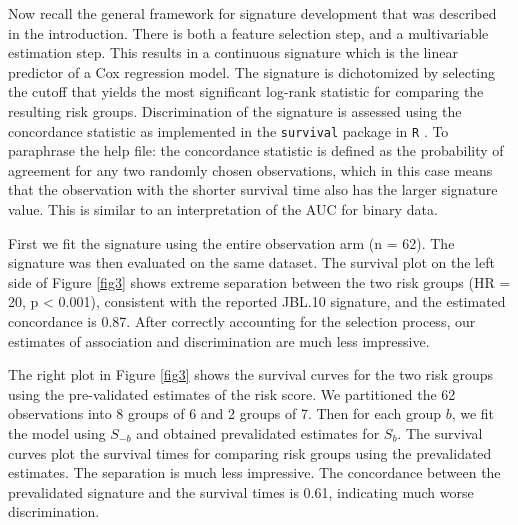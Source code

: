 \documentclass[11pt,]{article}
\begin{document}
Now recall the general framework for signature development that was
described in the introduction. There is both a feature selection step,
and a multivariable estimation step. This results in a continuous
signature which is the linear predictor of a Cox regression model. The
signature is dichotomized by selecting the cutoff that yields the most
significant log-rank statistic for comparing the resulting risk groups.
Discrimination of the signature is assessed using the concordance
statistic as implemented in the \texttt{survival} package in \texttt{R}
\citep{survival}. To paraphrase the help file: the concordance statistic
is defined as the probability of agreement for any two randomly chosen
observations, which in this case means that the observation with the
shorter survival time also has the larger signature value. This is
similar to an interpretation of the AUC for binary data.

First we fit the signature using the entire observation arm (n = 62).
The signature was then evaluated on the same dataset. The survival plot
on the left side of Figure \ref{fig3} shows extreme separation between
the two risk groups (HR = 20, p \textless{} 0.001), consistent with the
reported JBL.10 signature, and the estimated concordance is 0.87. After
correctly accounting for the selection process, our estimates of
association and discrimination are much less impressive.

The right plot in Figure \ref{fig3} shows the survival curves for the
two risk groups using the pre-validated estimates of the risk score. We
partitioned the 62 observations into 8 groups of 6 and 2 groups of 7.
Then for each group \(b\), we fit the model using \(S_{-b}\) and
obtained prevalidated estimates for \(S_{b}\). The survival curves plot
the survival times for comparing risk groups using the prevalidated
estimates. The separation is much less impressive. The concordance
between the prevalidated signature and the survival times is 0.61,
indicating much worse discrimination.
\end{document}
